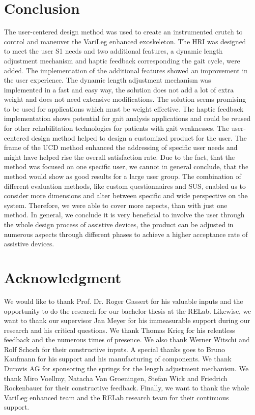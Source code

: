 \documentclass[conference,a4paper]{IEEEtran}
\begin{document}

\section{Conclusion}
The user-centered design method was used to create an instrumented crutch to control and maneuver the VariLeg enhanced exoskeleton. The HRI was designed to meet the user S1 needs and two additional features, a dynamic length adjustment mechanism and haptic feedback corresponding the gait cycle, were added.
The implementation of the additional features showed an improvement in the user experience. The dynamic length adjustment mechanism was implemented in a fast and easy way, the solution does not add a lot of extra weight and does not need extensive modifications. The solution seems promising to be used for applications which must be weight effective.
The haptic feedback implementation shows potential for gait analysis applications and could be reused for other rehabilitation technologies for patients with gait weaknesses.
The user-centered design method helped to design a customized product for the user. The frame of the UCD method enhanced the addressing of specific user needs and might have helped rise the overall satisfaction rate. Due to the fact, that the method was focused on one specific user, we cannot in general conclude, that the method would show as good results for a large user group. 
The combination of different evaluation methods, like custom questionnaires and SUS, enabled us to consider more dimensions and alter between specific and wide perspective on the system. Therefore, we were able to cover more aspects, than with just one method. 
In general, we conclude it is very beneficial to involve the user through the whole design process of assistive devices, the product can be adjusted in numerous aspects through different phases to achieve a higher acceptance rate of assistive devices.\\




\section{Acknowledgment}
We would like to thank Prof. Dr. Roger Gassert for his valuable inputs and the opportunity to do the research for our bachelor thesis at the RELab. Likewise, we want to thank our supervisor Jan Meyer for his immeasurable support during our research and his critical questions. We thank Thomas Krieg for his relentless feedback and the numerous times of presence. We also thank Werner Witschi and Rolf Schoch for their constructive inputs. A special thanks goes to Bruno Kaufmann for his support and his manufacturing of components. We thank Durovis AG for sponsoring the springs for the length adjustment mechanism. We thank Miro Voellmy, Natacha Van Groeningen, Stefan Wick and Friedrich Rockenbauer for their constructive feedback. Finally, we want to thank the whole VariLeg enhanced team and the RELab research team for their continuous support.
\end{document}
